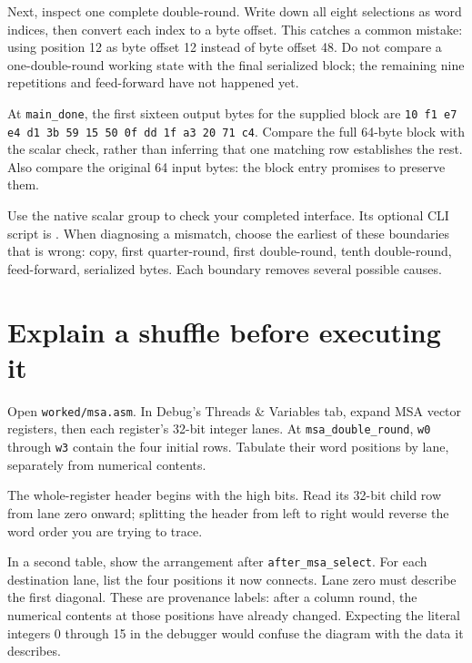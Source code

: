 Next, inspect one complete double-round. Write down all eight selections as
word indices, then convert each index to a byte offset. This catches a common
mistake: using position 12 as byte offset 12 instead of byte offset 48.
Do not compare a one-double-round working state with the final serialized block;
the remaining nine repetitions and feed-forward have not happened yet.

At \texttt{main\_done}, the first sixteen output bytes for the supplied block
are \texttt{10 f1 e7 e4 d1 3b 59 15 50 0f dd 1f a3 20 71 c4}.
Compare the full 64-byte block with the scalar check, rather than inferring that
one matching row establishes the rest. Also compare the original 64 input bytes:
the block entry promises to preserve them.

Use the native scalar group to check your completed interface. Its optional
CLI script is .
When diagnosing a mismatch, choose the earliest of these boundaries that is
wrong: copy, first quarter-round, first double-round, tenth double-round,
feed-forward, serialized bytes. Each boundary removes several possible causes.

\section{Explain a shuffle before executing it}

Open \texttt{worked/msa.asm}. In Debug's Threads \& Variables tab, expand
MSA vector registers, then each register's 32-bit integer lanes. At
\texttt{msa\_double\_round}, \texttt{w0} through \texttt{w3} contain the four
initial rows. Tabulate their word positions by lane, separately from numerical
contents.

The whole-register header begins with the high bits. Read its 32-bit child row
from lane zero onward; splitting the header from left to right would reverse
the word order you are trying to trace.



In a second table, show the arrangement after \texttt{after\_msa\_select}.
For each destination lane, list the four positions it now connects. Lane zero
must describe the first diagonal. These are provenance labels: after a column
round, the numerical contents at those positions have already changed.
Expecting the literal integers 0 through 15 in the debugger would confuse the
diagram with the data it describes.

